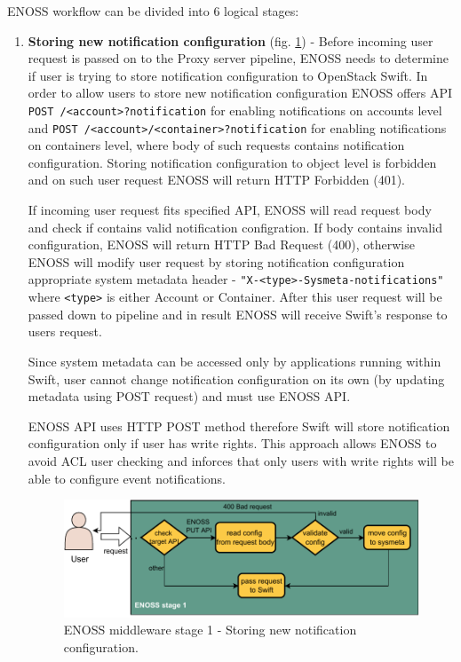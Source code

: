     ENOSS workflow can be divided into 6 logical stages:
    \begin{enumerate}
        \item \textbf{Storing new notification configuration} (fig. \ref{fig:enoss-stage1}) - Before incoming user request is passed on to the Proxy server pipeline, ENOSS needs to determine if user is trying to store notification configuration to OpenStack Swift. In order to allow users to store new notification configuration ENOSS offers API \texttt{POST /<account>?notification} for enabling notifications on accounts level and \texttt{POST /<account>/<container>?notification} for enabling notifications on containers level, where body of such requests contains notification configuration. Storing notification configuration to object level is forbidden and on such user request ENOSS will return HTTP Forbidden (401).

        If incoming user request fits specified API, ENOSS will read request body and check if contains valid notification configration. If body contains invalid configuration, ENOSS will return HTTP Bad Request (400), otherwise ENOSS will modify user request by storing notification configuration appropriate system metadata header - \texttt{"X-<type>-Sysmeta-notifications"} where \texttt{<type>} is either Account or Container. After this user request will be passed down to pipeline and in result ENOSS will receive Swift's response to users request.

        Since system metadata can be accessed only by applications running within Swift, user cannot change notification configuration on its own (by updating metadata using POST request) and must use ENOSS API.

        ENOSS API uses HTTP POST method therefore Swift will store notification configuration only if user has write rights. This approach allows ENOSS to avoid ACL user checking and inforces that only users with write rights will be able to configure event notifications.

        \begin{figure}[H]
            \centering
            \includegraphics[width=1\textwidth]{obrazky-figures/enoss-stage1.pdf}
            \caption{ENOSS middleware stage 1 - Storing new notification configuration.}
            \label{fig:enoss-stage1}
        \end{figure}


\end{enumerate}
